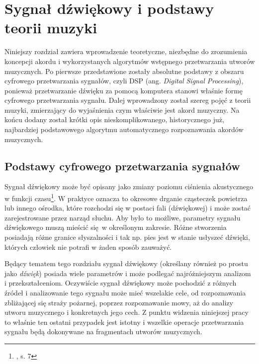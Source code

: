 \chapter{Sygnał dźwiękowy i podstawy teorii muzyki} \label{chapter:music_theory}

Niniejszy rozdział zawiera wprowadzenie teoretyczne, niezbędne do zrozumienia koncepcji akordu i wykorzystanych algorytmów wstępnego przetwarzania utworów muzycznych. Po pierwsze przedstawione zostały absolutne podstawy z obszaru cyfrowego przetwarzania sygnałów, czyli DSP (ang. \emph{Digital Signal Processing}), ponieważ przetwarzanie dźwięku za pomocą komputera stanowi właśnie formę cyfrowego przetwarzania sygnału. Dalej wprowadzony został szereg pojęć z teorii muzyki, zmierzający do wyjaśnienia czym właściwie jest akord muzyczny. Na końcu dodany został krótki opis nieskomplikowanego, historycznego już, najbardziej podstawowego algorytmu automatycznego rozpoznawania akordów muzycznych.



\section{Podstawy cyfrowego przetwarzania sygnałów}

Sygnał dźwiękowy może być opisany jako zmiany poziomu ciśnienia akustycznego w funkcji czasu\footnote{\cite{lerch_introduction_2012}, s. 7}. W praktyce oznacza to okresowe drganie cząsteczek powietrza lub innego ośrodka, które rozchodzi się w postaci fali (dźwiękowej) i może zostać zarejestrowane przez narząd słuchu. Aby było to możliwe, parametry sygnału dźwiękowego muszą mieścić się w określonym zakresie. Różne stworzenia posiadają różne granice słyszalności i tak np. pies jest w stanie usłyszeć dźwięki, których człowiek nie potrafi w żaden sposób zauważyć. 

Będący tematem tego rozdziału sygnał dźwiękowy (określany również po prostu jako \emph{dźwięk}) posiada wiele parametrów i może podlegać najróżniejszym analizom i przekształceniom.  Oczywiście sygnał dźwiękowy może pochodzić z różnych źródeł i analizowanie tego sygnału może mieć wszelakie cele, od rozpoznawania zbliżającej się straży pożarnej, poprzez rozpoznawanie mowy, aż do analizy utworu muzycznego i konkretnych jego cech. Z punktu widzenia niniejszej pracy to właśnie ten ostatni przypadek jest istotny i wszelkie operacje przetwarzania sygnału będą dokonywane na fragmentach utworów muzycznych.

